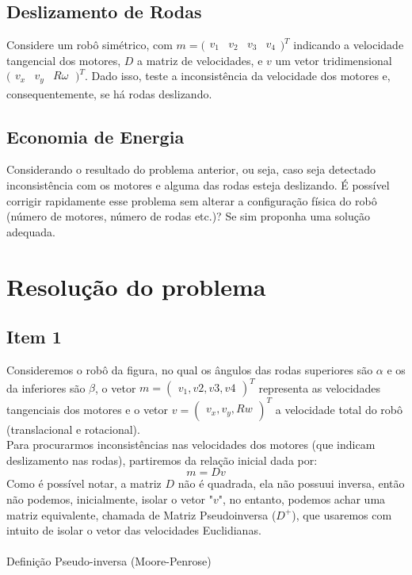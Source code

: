 \documentclass{article}
\begin{document}
\subsection{Deslizamento de Rodas}

\hspace{1cm}Considere um robô simétrico, com $m=\bigl(\begin{smallmatrix}v_{1}&v_{2}&v_{3}&v_{4} \end{smallmatrix})^T$ indicando a velocidade tangencial dos motores,
$D$ a matriz de velocidades, e $v$ um vetor tridimensional $\bigl(\begin{smallmatrix}v_{x}&v_{y}&R{\omega}\ \end{smallmatrix})^T$.
Dado isso, teste a inconsistência da velocidade dos motores e, consequentemente, se há rodas deslizando.

\subsection{Economia de Energia}

\hspace{1cm}Considerando o resultado do problema anterior, ou seja, caso seja detectado inconsistência com os motores e alguma das rodas esteja deslizando.
É possível corrigir rapidamente esse problema sem alterar a configuração física do robô (número de motores, número de rodas etc.)? Se sim proponha uma solução adequada.

\section{Resolução do problema}
\subsection{Item 1}

\hspace{1cm}Consideremos o robô da figura, no qual os ângulos das rodas superiores são $\alpha$ e os da inferiores são $\beta$, o vetor $m = \begin{pmatrix} v_{1},v2,v3,v4 \end{pmatrix}^T$ representa
as velocidades tangenciais dos motores e o vetor $v = \begin{pmatrix} v_{x},v_{y},Rw \end{pmatrix}^T$ a velocidade total do robô (translacional e rotacional).
\\ \hspace{1cm} Para procurarmos inconsistências nas velocidades dos motores (que indicam deslizamento nas rodas), partiremos da relação inicial dada por:
\[m = Dv\]
\hspace{1cm}Como é possível notar, a matriz $D$ não é quadrada, ela não possuui inversa, então não podemos, inicialmente, isolar o vetor "$v$", no entanto, podemos achar uma matriz equivalente, chamada de Matriz Pseudoinversa ($D^+$), que usaremos com intuito de isolar o vetor das velocidades Euclidianas.
\\ \\ Definição Pseudo-inversa (Moore-Penrose)
\end{document}
